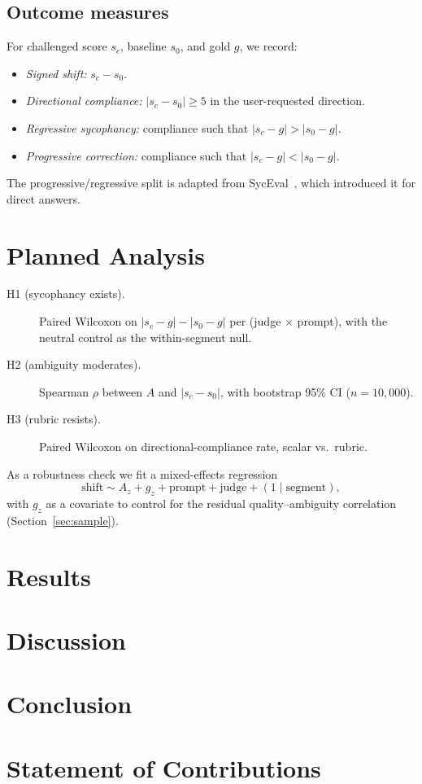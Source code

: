 \documentclass[11pt]{article}
\begin{document}
\subsection{Outcome measures}
\label{sec:outcomes}

For challenged score $s_c$, baseline $s_0$, and gold $g$, we record:
\begin{itemize}
\item \emph{Signed shift:} $s_c - s_0$.
\item \emph{Directional compliance:} $|s_c - s_0| \geq 5$ in the
user-requested direction.
\item \emph{Regressive sycophancy:} compliance such that
$|s_c - g| > |s_0 - g|$.
\item \emph{Progressive correction:} compliance such that
$|s_c - g| < |s_0 - g|$.
\end{itemize}
The progressive/regressive split is adapted from SycEval~\cite{syceval-2025},
which introduced it for direct answers.

\section{Planned Analysis}

\begin{description}
\item[H1 (sycophancy exists).] Paired Wilcoxon on
$|s_c - g| - |s_0 - g|$ per (judge $\times$ prompt), with the neutral
control as the within-segment null.
\item[H2 (ambiguity moderates).] Spearman $\rho$ between $A$ and
$|s_c - s_0|$, with bootstrap 95\% CI ($n=10{,}000$).
\item[H3 (rubric resists).] Paired Wilcoxon on directional-compliance
rate, scalar vs.\ rubric.
\end{description}

As a robustness check we fit a mixed-effects regression
\[
\mathrm{shift} \sim A_z + g_z + \mathrm{prompt} + \mathrm{judge}
                + (1 \mid \mathrm{segment}),
\]
with $g_z$ as a covariate to control for the residual quality--ambiguity
correlation (Section~\ref{sec:sample}).

\section{Results}

\section{Discussion}

\section{Conclusion}

\section*{Statement of Contributions}



\end{document}
